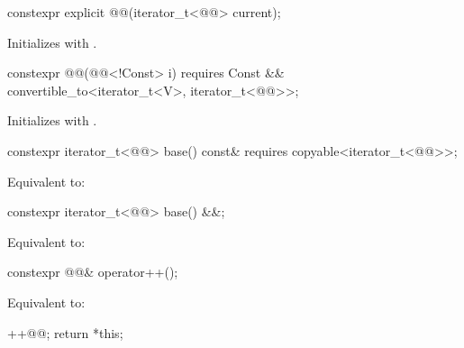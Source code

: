 %
\begin{itemdecl}
constexpr explicit @@(iterator_t<@@> current);
\end{itemdecl}

\begin{itemdescr}
\pnum
\effects
Initializes  with .
\end{itemdescr}

%
\begin{itemdecl}
constexpr @@(@@<!Const> i)
  requires Const && convertible_to<iterator_t<V>, iterator_t<@@>>;
\end{itemdecl}

\begin{itemdescr}
\pnum
\effects
Initializes  with .
\end{itemdescr}

%
\begin{itemdecl}
constexpr iterator_t<@@> base() const&
  requires copyable<iterator_t<@@>>;
\end{itemdecl}

\begin{itemdescr}
\pnum
\effects
Equivalent to: 
\end{itemdescr}

%
\begin{itemdecl}
constexpr iterator_t<@@> base() &&;
\end{itemdecl}

\begin{itemdescr}
\pnum
\effects
Equivalent to: 
\end{itemdescr}

%
\begin{itemdecl}
constexpr @@& operator++();
\end{itemdecl}

\begin{itemdescr}
\pnum
\effects
Equivalent to:
\begin{codeblock}
++@@;
return *this;
\end{codeblock}
\end{itemdescr}

